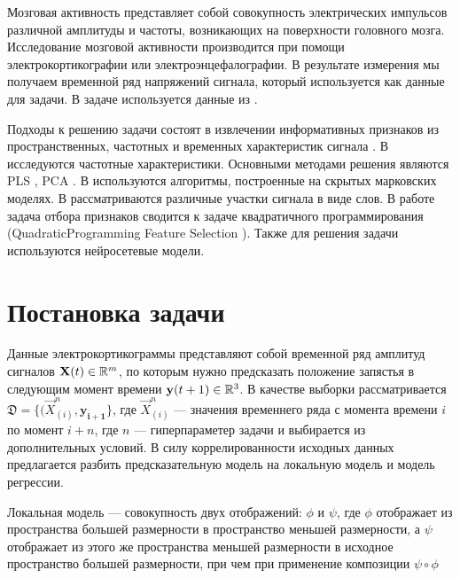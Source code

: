 \documentclass[12pt, twoside]{article}
\begin{document}
Мозговая активность представляет собой совокупность электрических импульсов различной амплитуды и частоты, возникающих на поверхности головного мозга. Исследование мозговой активности производится при помощи  электрокортикографии \cite{hill2012recording} или \cite{aminoff2012electroencephalography} электроэнцефалографии. В результате измерения мы получаем временной ряд напряжений сигнала, который используется как данные для задачи. В задаче используется данные из \cite{chao2010long}.

 Подходы \cite{morishita2014brain, alexander2013traveling} к решению задачи состоят в извлечении информативных признаков из пространственных, частотных и временных характеристик сигнала . 
В \cite{chin2007identification, eliseyev2014stable, loza2017unsupervised} исследуются частотные характеристики. Основными методами решения являются PLS \cite{eliseyev2014stable,eliseyev2016penalized, rosipal2005overview}, PCA \cite{rosipal2005overview, eliseyev2016penalized}. В \cite{zhao2014coupled} используются алгоритмы, построенные на скрытых марковских моделях. В \cite{loza2017unsupervised, zhao2010ecog} рассматриваются различные участки сигнала в виде слов. В работе \cite{motrenko2018multi} задача отбора признаков сводится к задаче квадратичного программирования (QuadraticProgramming Feature Selection \cite{rodriguez2010quadratic}). Также для решения задачи используются нейросетевые модели\cite{xie2018deep}. 
\newpage
\section{Постановка задачи}
Данные электрокортикограммы представляют собой временной ряд амплитуд сигналов $\mathbf{X}(t)  \in \mathbb{R}^{m}$, по которым нужно предсказать положение запястья в следующим момент времени $\mathbf{y}(t+1) \in \mathbb{R}^3$. В качестве выборки рассматривается $\mathfrak{D} = \{(\vec{X}_{(i)}^n, \mathbf{y_{i+1}}\}$, где $\vec{X}_{(i)}^n$ --- значения временнего ряда с момента времени $i$ по момент $i + n$, где $n$ --- гиперпараметер задачи и выбирается из дополнительных условий. В силу коррелированности исходных данных предлагается разбить предсказательную модель на локальную модель и модель регрессии.

\begin{Def}
	Локальная модель --- совокупность двух отображений: $\phi$ и $\psi$, где 
	$\phi$ отображает из пространства большей размерности в пространство меньшей размерности, а $\psi$ отображает из этого же пространства меньшей размерности в исходное пространство большей размерности, при чем при применение композиции $\psi \circ \phi$ 
\end{Def}
\end{document}

